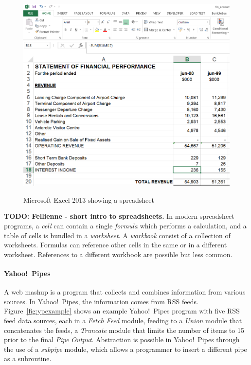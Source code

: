 \documentclass[10pt,conference,compsocconf]{IEEEtran}
\newcommand{\todo}[1]{\textbf{TODO: #1}}
\begin{document}
\begin{figure}
\caption{Microsoft Excel 2013 showing a spreadsheet}
\centering
\includegraphics[width=\columnwidth]{excel-2}
\label{fig:spreadsheetexample}
\end{figure}

\todo{Fellienne - short intro to spreadsheets.}
In modern spreadsheet programs, a \textit{cell} can contain a single \textit{formula} which performs a calculation, and a table of cells is bundled in a \textit{worksheet}.
A \textit{workbook} consist of a collection of worksheets.
Formulas can reference other cells in the same or in a different worksheet.
References to a different workbook are possible but less common.


\paragraph{Yahoo!\ Pipes}
A web mashup is a program that collects and combines information from various
sources. 
In  Yahoo!\ Pipes, the information comes from RSS feeds. Figure~\ref{fig:ypexample} shows an example Yahoo!\ Pipes program with five RSS feed data sources, each in a \emph{Fetch Feed} module, feeding to a \emph{Union} module that concatenates the feeds, a \emph{Truncate} module that limits the number of items to 15 prior to the final \emph{Pipe Output}. 
Abstraction is possible in Yahoo!\ Pipes through the use of a \emph{subpipe} module, which allows a programmer to insert a different pipe as a subroutine. 
\end{document}
